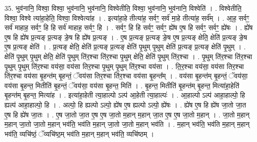 \documentclass[17pt]{extarticle}
\begin{document}
35. भुव॑नानि॒ विश्वा॒ विश्वा॒ भुव॑नानि॒ भुव॑नानि॒ विश्वेतीति॒ विश्वा॒ भुव॑नानि॒ भुव॑नानि॒ विश्वेति॑ । . विश्वेतीति॒ विश्वा॒ विश्वे त्या॑हा॒हेति॒ विश्वा॒ विश्वेत्या॑ह । . इत्या॑हा॒हे तीत्या॑ह॒ सर्वꣳ॒॒ सर्व॑ मा॒हे तीत्या॑ह॒ सर्व᳚म् । . आ॒ह॒ सर्वꣳ॒॒ सर्व॑ माहाह॒ सर्वꣳ॒॒ हि हि सर्व॑ माहाह॒ सर्वꣳ॒॒ हि । . सर्वꣳ॒॒ हि हि सर्वꣳ॒॒ सर्वꣳ॒॒ ह्ये॑ष ए॒ष हि सर्वꣳ॒॒ सर्वꣳ॒॒ ह्ये॑षः । . ह्ये॑ष ए॒ष हि ह्ये॑ष प्र॒त्यङ् प्र॒त्यङ् ङे॒ष हि ह्ये॑ष प्र॒त्यङ् । . ए॒ष प्र॒त्यङ् प्र॒त्यङ् ङे॒ष ए॒ष प्र॒त्यङ् क्षेति॒ क्षेति॑ प्र॒त्यङ् ङे॒ष ए॒ष प्र॒त्यङ् क्षेति॑ । . प्र॒त्यङ् क्षेति॒ क्षेति॑ प्र॒त्यङ् प्र॒त्यङ् क्षेति॑ पृ॒थुम् पृ॒थुम् क्षेति॑ प्र॒त्यङ् प्र॒त्यङ् क्षेति॑ पृ॒थुम् । . क्षेति॑ पृ॒थुम् पृ॒थुम् क्षेति॒ क्षेति॑ पृ॒थुम् ति॑र॒श्चा ति॑र॒श्चा पृ॒थुम् क्षेति॒ क्षेति॑ पृ॒थुम् ति॑र॒श्चा । . पृ॒थुम् ति॑र॒श्चा ति॑र॒श्चा पृ॒थुम् पृ॒थुम् ति॑र॒श्चा वय॑सा॒ वय॑सा तिर॒श्चा पृ॒थुम् पृ॒थुम् ति॑र॒श्चा वय॑सा । . ति॒र॒श्चा वय॑सा॒ वय॑सा तिर॒श्चा ति॑र॒श्चा वय॑सा बृ॒हन्त॑म् बृ॒हन्तं॒ ॅवय॑सा तिर॒श्चा ति॑र॒श्चा वय॑सा बृ॒हन्त᳚म् । . वय॑सा बृ॒हन्त॑म् बृ॒हन्तं॒ ॅवय॑सा॒ वय॑सा बृ॒हन्त॒ मितीति॑ बृ॒हन्तं॒ ॅवय॑सा॒ वय॑सा बृ॒हन्त॒ मिति॑ । . बृ॒हन्त॒ मितीति॑ बृ॒हन्त॑म् बृ॒हन्त॒ मित्या॑हा॒हेति॑ बृ॒हन्त॑म् बृ॒हन्त॒ मित्या॑ह । . इत्या॑हा॒हेती त्या॒हाल्पो ऽल्प॑ आ॒हेती त्या॒हाल्पः॑ । . आ॒हाल्पो ऽल्प॑ आहा॒हाल्पो॒ हि ह्यल्प॑ आहा॒हाल्पो॒ हि । . अल्पो॒ हि ह्यल्पो ऽल्पो॒ ह्ये॑ष ए॒ष ह्यल्पो ऽल्पो॒ ह्ये॑षः । . ह्ये॑ष ए॒ष हि ह्ये॑ष जा॒तो जा॒त ए॒ष हि ह्ये॑ष जा॒तः । . ए॒ष जा॒तो जा॒त ए॒ष ए॒ष जा॒तो म॒हान् म॒हान् जा॒त ए॒ष ए॒ष जा॒तो म॒हान् । . जा॒तो म॒हान् म॒हान् जा॒तो जा॒तो म॒हान् भव॑ति॒ भव॑ति म॒हान् जा॒तो जा॒तो म॒हान् भव॑ति । . म॒हान् भव॑ति॒ भव॑ति म॒हान् म॒हान् भव॑ति॒ व्यचि॑ष्ठं॒ ॅव्यचि॑ष्ठ॒म् भव॑ति म॒हान् म॒हान् भव॑ति॒ व्यचि॑ष्ठम् । \newline
\pagebreak
{}
\end{document}

